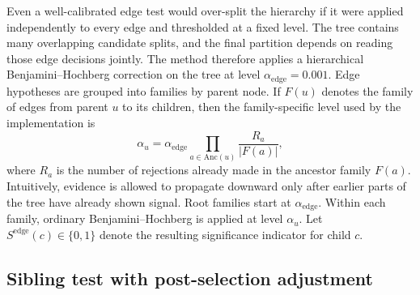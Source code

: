 Even a well-calibrated edge test would over-split the hierarchy if it were
applied independently to every edge and thresholded at a fixed level. The tree
contains many overlapping candidate splits, and the final partition depends on
reading those edge decisions jointly. The method therefore applies a
hierarchical Benjamini--Hochberg correction on the tree
\citep{bogomolov2021hypotheses} at level
$\alpha_{\mathrm{edge}} = 0.001$. Edge hypotheses are grouped into families by
parent node. If $F(u)$ denotes the family of edges from parent $u$ to its
children, then the family-specific level used by the implementation is
\begin{equation}
\alpha_u
=
\alpha_{\mathrm{edge}}
\prod_{a \in \mathrm{Anc}(u)}
\frac{R_a}{|F(a)|},
\end{equation}
where $R_a$ is the number of rejections already made in the ancestor family
$F(a)$. Intuitively, evidence is allowed to propagate downward only after
earlier parts of the tree have already shown signal. Root families start at
$\alpha_{\mathrm{edge}}$. Within each family, ordinary Benjamini--Hochberg is
applied at level $\alpha_u$. Let
$S^{\mathrm{edge}}(c) \in \{0,1\}$ denote the resulting significance indicator
for child $c$.

\subsection{Sibling test with post-selection adjustment}

